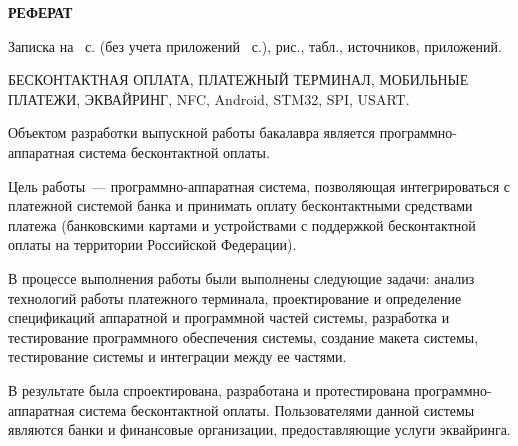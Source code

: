 \newpage

\begin{center}
	\textbf{РЕФЕРАТ}
\end{center}

Записка на~\pageref{LastPage} с. (без учета приложений~ с.),  рис., \totaltables{} табл.,  источников,  приложений.

БЕСКОНТАКТНАЯ ОПЛАТА, ПЛАТЕЖНЫЙ ТЕРМИНАЛ, МОБИЛЬНЫЕ ПЛАТЕЖИ, ЭКВАЙРИНГ, NFC, Android, STM32, SPI, USART.

Объектом разработки выпускной работы бакалавра является программно-аппаратная система бесконтактной оплаты.

Цель работы~--- программно-аппаратная система, позволяющая интегрироваться с платежной системой банка и принимать оплату бесконтактными средствами платежа (банковскими картами и устройствами с поддержкой бесконтактной оплаты на территории Российской Федерации).

В процессе выполнения работы были выполнены следующие задачи: анализ технологий работы платежного терминала, проектирование и определение спецификаций аппаратной и программной частей системы, разработка и тестирование программного обеспечения системы, создание макета системы, тестирование системы и интеграции между ее частями.

В результате была спроектирована, разработана и протестирована программно-аппаратная система бесконтактной оплаты.
Пользователями данной системы являются банки и финансовые организации, предоставляющие услуги эквайринга.
